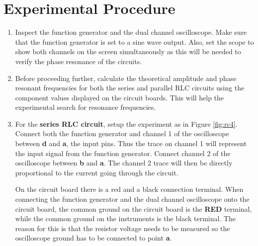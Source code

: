 \section{Experimental Procedure} 
\begin{enumerate}
\item Inspect the function generator and the dual channel oscilloscope. Make sure that the function generator is set to a sine wave output. Also, set the scope to show both channels on the screen simultaneously as this will be needed to verify the phase resonance of the circuits.

\item Before proceeding further, calculate the theoretical amplitude and phase resonant frequencies for  both the series and parallel RLC circuits using the component values displayed on the circuit boards. This will help the experimental search for resonance frequencies.

\item For the {\bf series RLC circuit}, setup the experiment as in Figure \ref{fig:rc4}. Connect both the function generator and channel 1 of the oscilloscope between {\bf d} and {\bf a}, the input pins. Thus the trace on channel 1 will represent the input signal from the function generator. Connect channel 2 of the oscilloscope between {\bf b} and {\bf a}. The channel 2 trace will then be directly proportional to the current going through the circuit.

On the circuit board there is a red and a black connection terminal. When connecting the function generator and the dual channel oscilloscope onto the circuit board, the common ground on the circuit board is the {\bf RED} terminal, while the common ground on the instruments is the black terminal. The reason for this is that the resistor voltage needs to be measured so the oscilloscope ground has to be connected to point {\bf a}.

\begin{figure}
\end{figure}
\end{enumerate}
